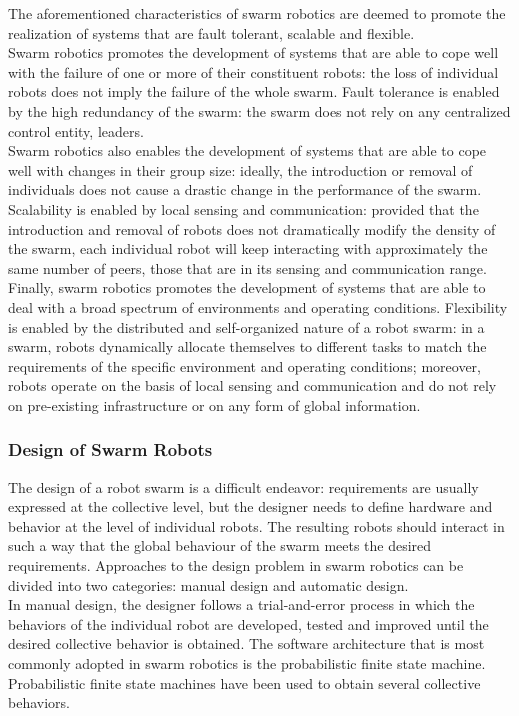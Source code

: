 The aforementioned characteristics of swarm robotics are deemed to promote the realization of systems that are fault tolerant, scalable and flexible.\\
Swarm robotics promotes the development of systems that are able to cope well with the failure of one or more of their constituent robots: the loss of individual robots does not imply the failure of the whole swarm. Fault tolerance is enabled by the high redundancy of the swarm: the swarm does not rely on any centralized control entity, leaders.\\
Swarm robotics also enables the development of systems that are able to cope well with changes in their group size: ideally, the introduction or removal of individuals does not cause a drastic change in the performance of the swarm. Scalability is enabled by local sensing and communication: provided that the introduction and removal of robots does not dramatically modify the density of the swarm, each individual robot will keep interacting with approximately the same number of peers, those that are in its sensing and communication range.\\
Finally, swarm robotics promotes the development of systems that are able to deal with a broad spectrum of environments and operating conditions. Flexibility is enabled by the distributed and self-organized nature of a robot swarm: in a swarm, robots dynamically allocate themselves to different tasks to match the requirements of the specific environment and operating conditions; moreover, robots operate on the basis of local sensing and communication and do not rely on pre-existing infrastructure or on any form of global information.
\subsubsection{Design of Swarm Robots}
The design of a robot swarm is a difficult endeavor: requirements are usually expressed at the collective level, but the designer needs to define hardware and behavior at the level of individual robots. The resulting robots should interact in such a way that the global behaviour of the swarm meets the desired requirements. Approaches to the design problem in swarm robotics can be divided into two categories: manual design and automatic design.\cite{swarmrobot}\\
In manual design, the designer follows a trial-and-error process in which the behaviors of the individual robot are developed, tested and improved until the desired collective behavior is obtained. The software architecture that is most commonly adopted in swarm robotics is the probabilistic finite state machine. Probabilistic finite state machines have been used to obtain several collective behaviors.
